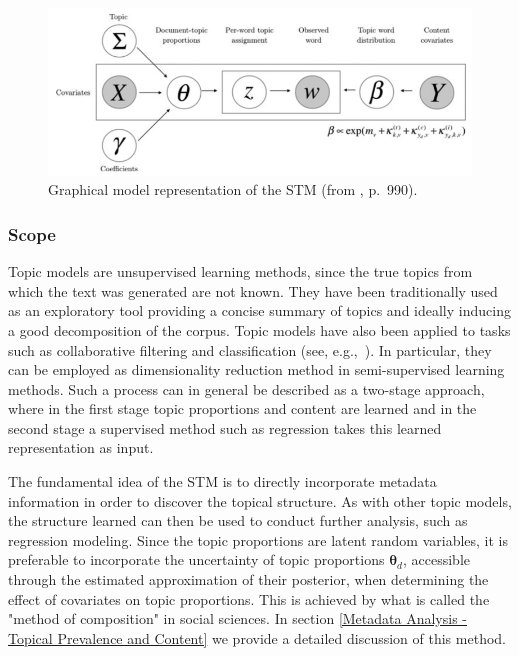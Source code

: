 \begin{figure}[h!]
  \centering
  \captionsetup{justification=centering,margin=2cm}
  \includegraphics[scale = 0.5]{../plots/2/stm_graphical.png}
  \caption{Graphical model representation of the STM (from \cite{roberts2016model}, p.\ 990).}
  \label{fig:graphical_model}
\end{figure}

\subsubsection*{Scope}

Topic models are unsupervised learning methods, since the true topics from which the text was generated are not known. They have been traditionally used as an exploratory tool providing a concise summary of topics and ideally inducing a good decomposition of the corpus. Topic models have also been applied to tasks such as collaborative filtering and classification (see, e.g.,\ \citealp{blei2003latent}). In particular, they can be employed as dimensionality reduction method in semi-supervised learning methods. Such a process can in general be described as a two-stage approach, where in the first stage topic proportions and content are learned and in the second stage a supervised method such as regression takes this learned representation as input. 

The fundamental idea of the STM is to directly incorporate metadata information in order to discover the topical structure. As with other topic models, the structure learned can then be used to conduct further analysis, such as regression modeling. Since the topic proportions are latent random variables, it is preferable to incorporate the uncertainty of topic proportions $\boldsymbol{\theta}_d$, accessible through the estimated approximation of their posterior, when determining the effect of covariates on topic proportions. This is achieved by what is called the "method of composition" in social sciences. In section \ref{Metadata Analysis - Topical Prevalence and Content} we provide a detailed discussion of this method.

